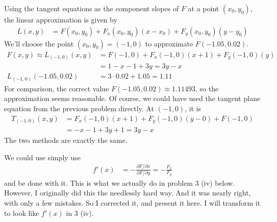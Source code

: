 \documentclass[a4paper,norsk,12pt]{article}
\begin{document}
Using the tangent equations as the component slopes of $F$ at a point $(x_0,
y_0)$, the linear approximation is given by
\begin{align*}
  L(x,y) &= F(x_0, y_0) + F_x(x_0, y_0)(x-x_0) + F_y(x_0, y_0)(y-y_0)
\end{align*}
We'll choose the point $(x_0, y_0) = (-1, 0)$ to approximate $F(-1.05, 0.02)$.
\begin{align*}
  F(x,y) \approx
  L_{(-1,0)}(x,y)
    &= F(-1,0) + F_x(-1,0)(x+1) + F_y(-1,0)(y) \\
    &= 1 - x - 1 + 3y = 3y-x \\
  L_{(-1,0)}(-1.05, 0.02)
    &= 3\cdot0.02 + 1.05 = 1.11
\end{align*}
For comparison, the correct value $F(-1.05, 0.02) \approx 1.11493$, so the
approximation seems reasonable. Of course, we could have used the tangent plane
equation from the previous problem directly. At $(-1,0)$, it is
\begin{align*}
  T_{(-1,0)}(x,y)
    &= F_x(-1,0)(x+1) + F_y(-1,0)(y-0) + F(-1,0)\\
    &= -x-1 + 3y + 1 = 3y-x
\end{align*}
The two methods are exactly the same.

We could use simply use
\begin{align*}
  f'(x) &= -\frac{\partial F / \partial x}{\partial F / \partial y}
    = -\frac{F_x}{F_y}
\end{align*}
and be done with it. This is what we actually do in problem 3 (iv) below. However, I
originally did this the needlessly hard way. And it was nearly right, with only
a few mistakes. So I corrected it, and present it here. I will transform it to
look like $f'(x)$ in 3 (iv).

\end{document}
